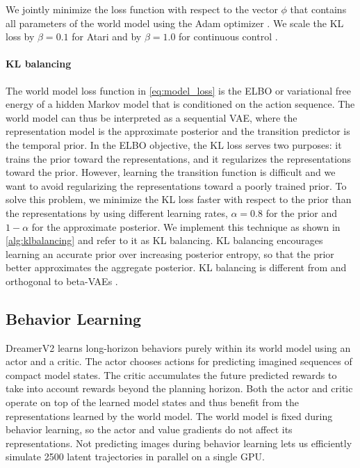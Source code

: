 
We jointly minimize the loss function with respect to the vector $\phi$ that contains all parameters of the world model using the Adam optimizer \citep{kingma2014adam}. We scale the KL loss by $\beta=0.1$ for Atari and by $\beta=1.0$ for continuous control \citep{higgins2016beta}.

\paragraph{KL balancing}

The world model loss function in \cref{eq:model_loss} is the ELBO or variational free energy of a hidden Markov model that is conditioned on the action sequence. The world model can thus be interpreted as a sequential VAE, where the representation model is the approximate posterior and the transition predictor is the temporal prior. In the ELBO objective, the KL loss serves two purposes: it trains the prior toward the representations, and it regularizes the representations toward the prior. However, learning the transition function is difficult and we want to avoid regularizing the representations toward a poorly trained prior. To solve this problem, we minimize the KL loss faster with respect to the prior than the representations by using different learning rates, $\alpha=0.8$ for the prior and $1-\alpha$ for the approximate posterior. We implement this technique as shown in \cref{alg:klbalancing} and refer to it as KL balancing. KL balancing encourages learning an accurate prior over increasing posterior entropy, so that the prior better approximates the aggregate posterior. KL balancing is different from and orthogonal to beta-VAEs \citep{higgins2016beta}.

\subsection{Behavior Learning}

DreamerV2 learns long-horizon behaviors purely within its world model using an actor and a critic. The actor chooses actions for predicting imagined sequences of compact model states. The critic accumulates the future predicted rewards to take into account rewards beyond the planning horizon. Both the actor and critic operate on top of the learned model states and thus benefit from the representations learned by the world model. The world model is fixed during behavior learning, so the actor and value gradients do not affect its representations. Not predicting images during behavior learning lets us efficiently simulate 2500 latent trajectories in parallel on a single GPU.

